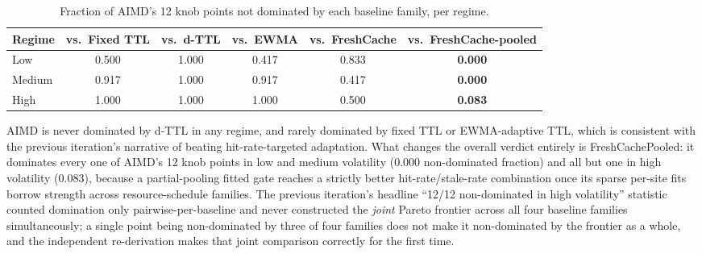 \documentclass[11pt,letterpaper]{article}
\begin{document}
\begin{table}[!htbp]
\centering
\caption{Fraction of AIMD's 12 knob points not dominated by each baseline family, per regime.}
\label{tab:baseline}
\begin{tabular}{lccccc}
\toprule
Regime & vs.\ Fixed TTL & vs.\ d-TTL & vs.\ EWMA & vs.\ FreshCache & vs.\ FreshCache-pooled \\
\midrule
Low & 0.500 & 1.000 & 0.417 & 0.833 & \textbf{0.000} \\
Medium & 0.917 & 1.000 & 0.917 & 0.417 & \textbf{0.000} \\
High & 1.000 & 1.000 & 1.000 & 0.500 & \textbf{0.083} \\
\bottomrule
\end{tabular}
\end{table}

AIMD is never dominated by d-TTL in any regime, and rarely dominated by fixed TTL or EWMA-adaptive TTL,
which is consistent with the previous iteration's narrative of beating hit-rate-targeted adaptation. What
changes the overall verdict entirely is FreshCachePooled: it dominates every one of AIMD's 12 knob points
in low and medium volatility (0.000 non-dominated fraction) and all but one in high volatility (0.083),
because a partial-pooling fitted gate reaches a strictly better hit-rate/stale-rate combination once its
sparse per-site fits borrow strength across resource-schedule families. The previous iteration's headline
``12/12 non-dominated in high volatility'' statistic counted domination only pairwise-per-baseline and never
constructed the \emph{joint} Pareto frontier across all four baseline families simultaneously; a single point
being non-dominated by three of four families does not make it non-dominated by the frontier as a whole,
and the independent re-derivation makes that joint comparison correctly for the first time.
\end{document}
